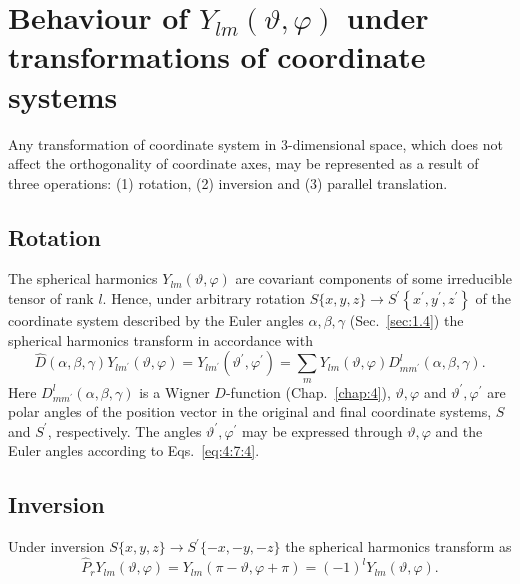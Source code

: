 \section{Behaviour of $Y_{l m}(\vartheta, \varphi)$ under transformations of coordinate systems}\label{sec:5.5}
Any transformation of coordinate system in 3-dimensional space, which does not affect the orthogonality of coordinate axes, may be represented as a result of three operations:
 (1) rotation, (2) inversion and (3) parallel translation.

\subsection{Rotation}\label{sec:5.5.1}
The spherical harmonics $Y_{l m}(\vartheta, \varphi)$ are covariant components of some irreducible tensor of rank $l$. Hence, under arbitrary rotation $S\{x, y, z\} \rightarrow S^{\prime}\left\{x^{\prime}, y^{\prime}, z^{\prime}\right\}$ of the coordinate system described by the Euler angles $\alpha, \beta, \gamma$ (Sec.~\ref{sec:1.4}) the spherical harmonics transform in accordance with
\begin{equation}
\hat{D}(\alpha, \beta, \gamma) Y_{l m^{\prime}}(\vartheta, \varphi)=Y_{l m^{\prime}}\left(\vartheta^{\prime}, \varphi^{\prime}\right)=\sum_{m} Y_{l m}(\vartheta, \varphi) D_{m m^{\prime}}^{l}(\alpha, \beta, \gamma). \label{eq:5:5:1}
\end{equation}
Here $D_{m m^{\prime}}^{l}(\alpha, \beta, \gamma)$ is a Wigner $D$-function (Chap.~\ref{chap:4}), $\vartheta, \varphi$ and $\vartheta^{\prime}, \varphi^{\prime}$ are polar angles of the position vector in the original and final coordinate systems, $S$ and $S^{\prime}$, respectively. The angles $\vartheta^{\prime}, \varphi^{\prime}$ may be expressed through $\vartheta, \varphi$ and the Euler angles according to Eqs.~\eqref{eq:4:7:4}.

\subsection{Inversion}\label{sec:5.5.2}
Under inversion $S\{x, y, z\} \rightarrow S^{\prime}\{-x,-y,-z\}$ the spherical harmonics transform as
\begin{equation}
\widehat{P}_{r} Y_{l m}(\vartheta, \varphi)=Y_{l m}(\pi-\vartheta, \varphi+\pi)=(-1)^{l} Y_{l m}(\vartheta, \varphi) . \label{eq:5:5:2}
\end{equation}
